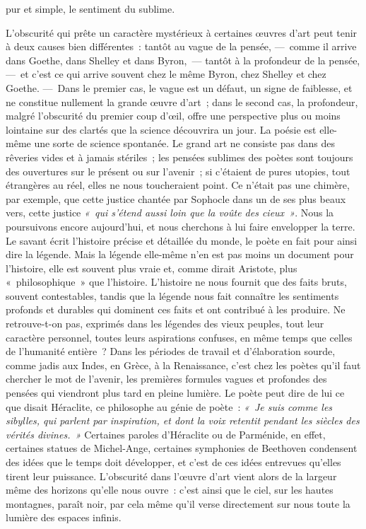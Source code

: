 \documentclass[french,twoside]{book} %
\begin{document}
pur et simple, le sentiment du sublime.\par
L’obscurité qui prête un caractère mystérieux à certaines œuvres d’art peut tenir à deux causes bien différentes : tantôt au vague de la pensée, — comme il arrive dans Goethe, dans Shelley et dans Byron, — tantôt à la profondeur de la pensée, — et c’est ce qui arrive souvent chez le même Byron, chez Shelley et chez Goethe. — Dans le premier cas, le vague est un défaut, un signe de faiblesse, et ne constitue nullement la grande œuvre d’art ; dans le second cas, la profondeur, malgré l’obscurité du premier coup d’œil, offre une perspective plus ou moins lointaine sur des clartés que la science découvrira un jour. La poésie est elle-même une sorte de science spontanée. Le grand  art ne consiste pas dans des rêveries vides et à jamais stériles ; les pensées sublimes des poètes sont toujours des ouvertures sur le présent ou sur l’avenir ; si c’étaient de pures utopies, tout étrangères au réel, elles ne nous toucheraient point. Ce n’était pas une chimère, par exemple, que cette justice chantée par Sophocle dans un de ses plus beaux vers, cette justice \emph{« qui s’étend aussi loin que la voûte des cieux »}. Nous la poursuivons encore aujourd’hui, et nous cherchons à lui faire envelopper la terre. Le savant écrit l’histoire précise et détaillée du monde, le poète en fait pour ainsi dire la légende. Mais la légende elle-même n’en est pas moins un document pour l’histoire, elle est souvent plus vraie et, comme dirait Aristote, plus « philosophique » que l’histoire. L’histoire ne nous fournit que des faits bruts, souvent contestables, tandis que la légende nous fait connaître les sentiments profonds et durables qui dominent ces faits et ont contribué à les produire. Ne retrouve-t-on pas, exprimés dans les légendes des vieux peuples, tout leur caractère personnel, toutes leurs aspirations confuses, en même temps que celles de l’humanité entière ? Dans les périodes de travail et d’élaboration sourde, comme jadis aux Indes, en Grèce, à la Renaissance, c’est chez les poètes qu’il faut chercher le mot de l’avenir, les premières formules vagues et profondes des pensées qui viendront plus tard en pleine lumière. Le poète peut dire de lui ce que disait Héraclite, ce philosophe au génie de poète : \emph{« Je suis comme les sibylles, qui parlent par inspiration, et dont la voix retentit pendant les siècles des vérités divines. »} Certaines paroles d’Héraclite ou de Parménide, en effet,  certaines statues de Michel-Ange, certaines symphonies de Beethoven condensent des idées que le temps doit développer, et c’est de ces idées entrevues qu’elles tirent leur puissance. L’obscurité dans l’œuvre d’art vient alors de la largeur même des horizons qu’elle nous ouvre : c’est ainsi que le ciel, sur les hautes montagnes, paraît noir, par cela même qu’il verse directement sur nous toute la lumière des espaces infinis.\par
\end{document}
